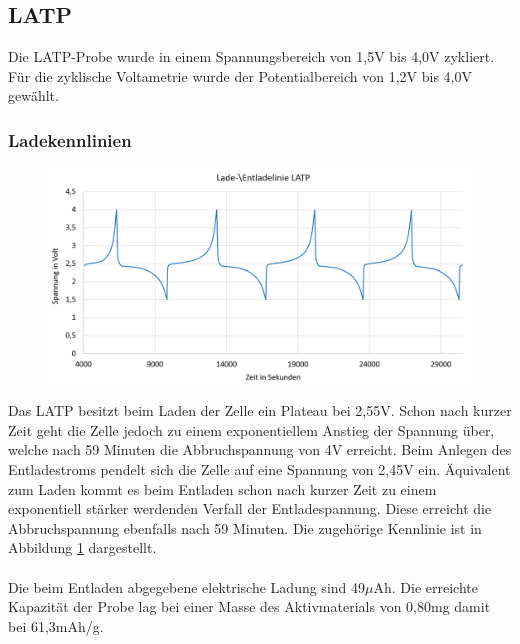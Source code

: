 \documentclass[a4paper, 11pt, headsepline,footsepline,twoside,abstract]{scrbook}
\begin{document}
\subsection{LATP}
Die LATP-Probe wurde in einem Spannungsbereich von 1,5V bis 4,0V zykliert. Für die zyklische Voltametrie wurde der Potentialbereich von 1,2V bis 4,0V gewählt.
\subsubsection{Ladekennlinien}
\begin{figure}
	\centering
	\includegraphics[width=1.0\columnwidth]{images/GCPL_LATP.png}
	\caption{}
	\label{gcpl_LATP}
\end{figure}
Das LATP besitzt beim Laden der Zelle ein Plateau bei 2,55V. Schon nach kurzer Zeit geht die Zelle jedoch zu einem exponentiellem Anstieg der Spannung über, welche nach 59 Minuten die Abbruchspannung von 4V erreicht. Beim Anlegen des Entladestroms pendelt sich die Zelle auf eine Spannung von 2,45V ein. Äquivalent zum Laden kommt es beim Entladen schon nach kurzer Zeit zu einem exponentiell stärker werdenden Verfall der Entladespannung. Diese erreicht die Abbruchspannung ebenfalls nach 59 Minuten. Die zugehörige Kennlinie ist in Abbildung \ref{gcpl_LATP} dargestellt. 
\\\\
Die beim Entladen abgegebene elektrische Ladung sind 49$\mu$Ah. Die erreichte Kapazität der Probe lag bei einer Masse des Aktivmaterials von 0,80mg damit bei 61,3mAh/g. 
\end{document}

